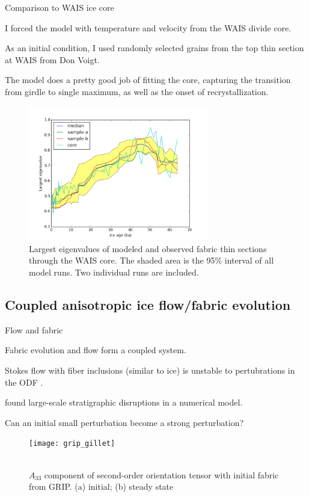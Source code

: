 \documentclass{beamer}
\begin{document}
\begin{frame}{Comparison to WAIS ice core}
   \begin{itemize}
         \small{
      \item I forced the model with temperature and velocity from the WAIS divide core.
      \item As an initial condition, I used randomly selected grains from the top thin section at WAIS from Don Voigt.
      \item The model does a pretty good job of fitting the core, capturing the transition from girdle to single maximum, as well as the onset of recrystallization.
      }
   \end{itemize}
\end{frame}
\begin{frame}
   \begin{figure}
   \includegraphics[width=0.7\textwidth]{good_fit}
   \caption{Largest eigenvalues of modeled and observed fabric thin sections through the WAIS core. The shaded area is the 95\% interval of all model runs. Two individual runs are included.}
\end{figure}
\end{frame}

\subsection{Coupled anisotropic ice flow/fabric evolution}
\begin{frame}{Flow and fabric}
      \begin{itemize} \small{
   \item Fabric evolution and flow form a coupled system.
   \item Stokes flow with fiber inclusions (similar to ice) is unstable to pertubrations in the ODF \citep{montgomery-smith2011}.
   \item \citet{gillet2006} found large-scale stratigraphic disruptions in a numerical model.
   \item Can an initial small perturbation become a strong perturbation?
   }
\end{itemize} 
\begin{figure}
   \texttt{[image: grip\_gillet]}
   \caption{\small{\\ $A_{33}$ component of second-order orientation tensor with initial fabric from GRIP. (a) initial; (b) steady state \citet{gillet2006}}}

\end{figure}
\end{frame}
\end{document}
